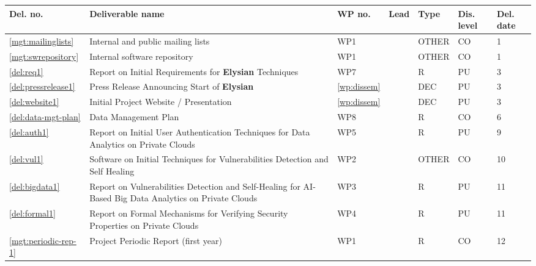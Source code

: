 \documentclass[a4paper,11pt]{article}
\newcommand{\project}[1]{\textbf{#1}\xspace}
\newcommand{\SECURITY}{\project{Elysian}}
\newcommand{\TheProject}{\SECURITY}
\begin{document}
\newpage
{}
\label{sect:deliverables}

\begin{minipage}{\textwidth}
\begin{center}
\begin{tabular}{|p{0.8cm}|p{9.65cm}|p{0.8cm}|p{1.15cm}|p{1.2cm}|p{0.8cm}|p{0.8cm}|}  \hline
\textbf{Del. no.}              & \textbf{Deliverable name}        & \textbf{WP no.} & \textbf{Lead}
& \textbf{Type}              & \textbf{Dis. level}   & \textbf{Del. date}
\\ \hline
\ref{mgt:mailinglists}           & Internal and public mailing lists
                                                                  & WP1 &\coordshort{} & OTHER & CO &  1 \\
\hline \ref{mgt:swrepository} & Internal software repository & WP1 & \coordshort{} & OTHER & CO & 1 \\
\hline \ref{del:req1} & Report on Initial Requirements for \TheProject{} Techniques & WP7 & \SOPRAshort{} & R & PU & 3 \\
\hline \ref{del:pressrelease1} & Press Release Announcing Start of \TheProject{} & \ref{wp:dissem} & \SAshort{} & DEC & PU & 3 \\
\hline \ref{del:website1} & Initial Project Website / Presentation & \ref{wp:dissem} & \UODshort{} & DEC & PU & 3 \\
\hline \ref{del:data-mgt-plan} & Data Management Plan & WP8 & \coordshort{} & R & CO & 6 \\
\hline \ref{del:auth1} & Report on Initial User Authentication Techniques for Data Analytics on Private Clouds & WP5 & \COGNIshort{} & R & PU & 9 \\
\hline \ref{del:vul1} & Software on Initial Techniques for Vulnerabilities Detection and Self Healing & WP2 & \YAGshort{} & OTHER & CO & 10 \\
\hline \ref{del:bigdata1} & Report on Vulnerabilities Detection and Self-Healing for AI-Based Big Data Analytics on Private Clouds & WP3 & \UODshort{} & R & PU & 11 \\
\hline \ref{del:formal1} & Report on Formal Mechanisms for Verifying Security Properties on Private Clouds & WP4 & \SCCHshort{} & R & PU & 11 \\
\hline \ref{mgt:periodic-rep-1} & Project Periodic Report (first year) & WP1 & \coordshort{} & R & CO & 12 \\

\end{tabular}
\end{center}
\end{minipage}
\end{document}
